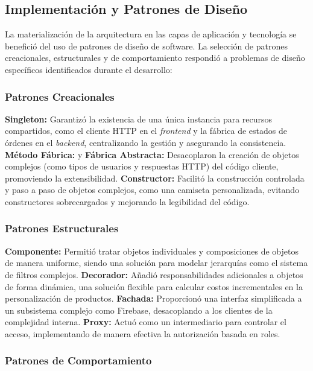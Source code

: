\subsection{Implementación y Patrones de Diseño}

La materialización de la arquitectura en las capas de aplicación y tecnología se benefició del uso de patrones de diseño de software. La selección de patrones creacionales, estructurales y de comportamiento respondió a problemas de diseño específicos identificados durante el desarrollo:

\subsubsection*{Patrones Creacionales}

\textbf{Singleton:} Garantizó la existencia de una única instancia para recursos compartidos, como el cliente HTTP en el \textit{frontend} y la fábrica de estados de órdenes en el \textit{backend}, centralizando la gestión y asegurando la consistencia.
\textbf{Método Fábrica:} y \textbf{Fábrica Abstracta:} Desacoplaron la creación de objetos complejos (como tipos de usuarios y respuestas HTTP) del código cliente, promoviendo la extensibilidad.
\textbf{Constructor:} Facilitó la construcción controlada y paso a paso de objetos complejos, como una camiseta personalizada, evitando constructores sobrecargados y mejorando la legibilidad del código.

\subsubsection*{Patrones Estructurales}

\textbf{Componente:} Permitió tratar objetos individuales y composiciones de objetos de manera uniforme, siendo una solución para modelar jerarquías como el sistema de filtros complejos.
\textbf{Decorador:} Añadió responsabilidades adicionales a objetos de forma dinámica, una solución flexible para calcular costos incrementales en la personalización de productos.
\textbf{Fachada:} Proporcionó una interfaz simplificada a un subsistema complejo como Firebase, desacoplando a los clientes de la complejidad interna.
\textbf{Proxy:} Actuó como un intermediario para controlar el acceso, implementando de manera efectiva la autorización basada en roles.

\subsubsection*{Patrones de Comportamiento}

